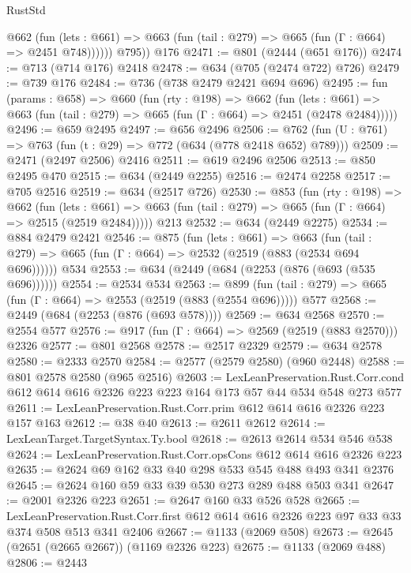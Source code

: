 \begin{lexlean}{RustStd}
\begin{coremodule}
            @662
              (fun (lets : @661) =>
              @663 (fun (tail : @279) => @665 (fun (Γ : @664) => @2451 @748))))))
        @795))
    @176
@2471 := @801 (@2444 (@651 @176))
@2474 := @713 (@714 @176) @2418
@2478 := @634 (@705 (@2474 @722) @726)
@2479 := @739 @176
@2484 := @736 (@738 @2479 @2421 @694 @696)
@2495 := fun (params : @658) =>
  @660
    (fun (rty : @198) =>
    @662
      (fun (lets : @661) =>
      @663 (fun (tail : @279) => @665 (fun (Γ : @664) => @2451 (@2478 @2484)))))
@2496 := @659 @2495
@2497 := @656 @2496
@2506 := @762 (fun (U : @761) => @763 (fun (t : @29) => @772 (@634 (@778 @2418 @652) @789)))
@2509 := @2471 (@2497 @2506) @2416
@2511 := @619 @2496 @2506
@2513 := @850 @2495 @470
@2515 := @634 (@2449 @2255)
@2516 := @2474 @2258
@2517 := @705 @2516
@2519 := @634 (@2517 @726)
@2530 := @853
    (fun (rty : @198) =>
    @662
      (fun (lets : @661) =>
      @663 (fun (tail : @279) => @665 (fun (Γ : @664) => @2515 (@2519 @2484)))))
    @213
@2532 := @634 (@2449 @2275)
@2534 := @884 @2479 @2421
@2546 := @875
    (fun (lets : @661) =>
    @663 (fun (tail : @279) => @665 (fun (Γ : @664) => @2532 (@2519 (@883 (@2534 @694 @696))))))
    @534
@2553 := @634 (@2449 (@684 (@2253 (@876 (@693 (@535 @696))))))
@2554 := @2534 @534
@2563 := @899 (fun (tail : @279) => @665 (fun (Γ : @664) => @2553 (@2519 (@883 (@2554 @696))))) @577
@2568 := @2449 (@684 (@2253 (@876 (@693 @578))))
@2569 := @634 @2568
@2570 := @2554 @577
@2576 := @917 (fun (Γ : @664) => @2569 (@2519 (@883 @2570))) @2326
@2577 := @801 @2568
@2578 := @2517 @2329
@2579 := @634 @2578
@2580 := @2333 @2570
@2584 := @2577 (@2579 @2580) (@960 @2448)
@2588 := @801 @2578 @2580 (@965 @2516)
@2603 := LexLeanPreservation.Rust.Corr.cond
    @612
    @614
    @616
    @2326
    @223
    @223
    @164
    @173
    @57
    @44
    @534
    @548
    @273
    @577
@2611 := LexLeanPreservation.Rust.Corr.prim @612 @614 @616 @2326 @223 @157 @163
@2612 := @38 @40
@2613 := @2611 @2612
@2614 := LexLeanTarget.TargetSyntax.Ty.bool
@2618 := @2613 @2614 @534 @546 @538
@2624 := LexLeanPreservation.Rust.Corr.opsCons @612 @614 @616 @2326 @223
@2635 := @2624 @69 @162 @33 @40 @298 @533 @545 @488 @493 @341 @2376
@2645 := @2624 @160 @59 @33 @39 @530 @273 @289 @488 @503 @341
@2647 := @2001 @2326 @223
@2651 := @2647 @160 @33 @526 @528
@2665 := LexLeanPreservation.Rust.Corr.first
    @612
    @614
    @616
    @2326
    @223
    @97
    @33
    @33
    @374
    @508
    @513
    @341
    @2406
@2667 := @1133 (@2069 @508)
@2673 := @2645 (@2651 (@2665 @2667)) (@1169 @2326 @223)
@2675 := @1133 (@2069 @488)
@2806 := @2443

\end{coremodule}
\end{lexlean}
